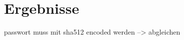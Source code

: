 
\section{Ergebnisse}
\label{sec:Ergebnisse}

passwort muss mit sha512 encoded werden --> abgleichen



